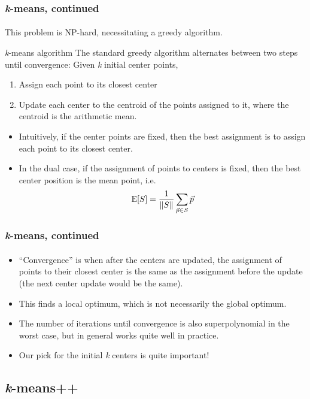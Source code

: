 \documentclass{beamer}                             %
\begin{document}
\begin{frame}
\frametitle{\textit{k}-means, continued}
\framesubtitle{}
This problem is NP-hard, necessitating a greedy algorithm. \pause

\begin{block}{\textit{k}-means algorithm}
The standard greedy algorithm alternates between two steps until convergence:
Given \textit{k} initial center points,
\begin{enumerate}[<+->]
  \item Assign each point to its closest center
  \item Update each center to the \alert{centroid} of the points assigned to it,
    where the centroid is the arithmetic mean.
\end{enumerate}
\end{block}

\begin{itemize}[<+->]
  \item Intuitively, if the center points are fixed, then the best
    assignment is to assign each point to its closest center.
  \item In the dual case, if the assignment of points to centers is
    fixed, then the best center position is the mean point, i.e.
    \[ \text{E}[S] = \frac{1}{\norm{S}} \sum_{\vec{p} \in S} \vec{p} \]
\end{itemize}
\end{frame}

\begin{frame}
\frametitle{\textit{k}-means, continued}
\framesubtitle{}
\begin{itemize}[<+->]
  \item \enquote{Convergence} is when after the centers are updated,
    the assignment of points to their closest center is the same as the
    assignment before the update (the next center update would be the same).
  \item This finds a local optimum, which
    is not necessarily the global optimum.
  \item The number of iterations until convergence is also superpolynomial
    in the worst case, but in general works quite well in practice.
  \item Our pick for the initial \textit{k} centers is quite important!
\end{itemize}
\end{frame}

\subsection{\textit{k}-means++}
\end{document}
